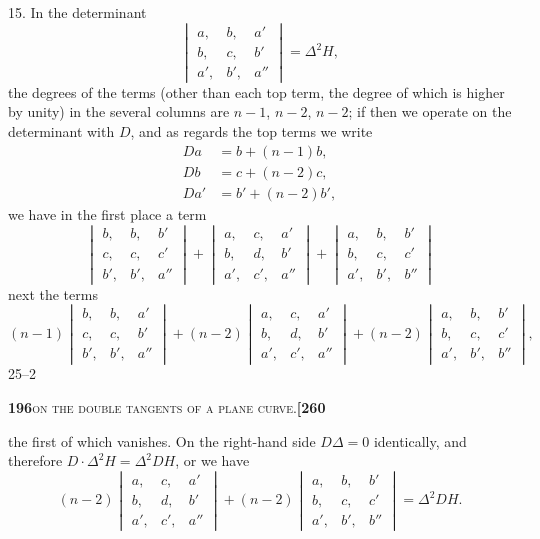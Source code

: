 \documentclass[11pt]{article}
\begin{document}
15. In the determinant
\[
\begin{vmatrix} a, & b, & a'\\ b, & c, & b'\\ a', & b', & a'' \end{vmatrix} = \Delta^2 H,
\]
the degrees of the terms (other than each top term, the degree of which is higher by unity) in the several columns are $n-1$, $n-2$, $n-2$; if then we operate on the determinant with $D$, and as regards the top terms we write
\[
\begin{aligned}
Da &= b + (n-1)b,\\
Db &= c + (n-2)c,\\
Da' &= b' + (n-2)b',
\end{aligned}
\]
we have in the first place a term
\[
\begin{vmatrix} b, & b, & b'\\ c, & c, & c'\\ b', & b', & a'' \end{vmatrix} + \begin{vmatrix} a, & c, & a'\\ b, & d, & b'\\ a', & c', & a'' \end{vmatrix} + \begin{vmatrix} a, & b, & b'\\ b, & c, & c'\\ a', & b', & b'' \end{vmatrix}
\]
next the terms
\[
(n-1)\begin{vmatrix} b, & b, & a'\\ c, & c, & b'\\ b', & b', & a'' \end{vmatrix} + (n-2)\begin{vmatrix} a, & c, & a'\\ b, & d, & b'\\ a', & c', & a'' \end{vmatrix} + (n-2)\begin{vmatrix} a, & b, & b'\\ b, & c, & c'\\ a', & b', & b'' \end{vmatrix},
\]
\hfill 25--2

\newpage

\noindent\textbf{196}\hfill\textsc{on the double tangents of a plane curve.}\hfill\textbf{[260}

\medskip

\noindent the first of which vanishes. On the right-hand side $D\Delta = 0$ identically, and therefore $D\cdot\Delta^2 H = \Delta^2 DH$, or we have
\[
(n-2)\begin{vmatrix} a, & c, & a'\\ b, & d, & b'\\ a', & c', & a'' \end{vmatrix} + (n-2)\begin{vmatrix} a, & b, & b'\\ b, & c, & c'\\ a', & b', & b'' \end{vmatrix} = \Delta^2 DH.
\]
\end{document}
